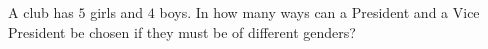 A club has $5$ girls and $4$ boys. In how many ways can a President and a Vice President be chosen if they must be of different genders?
